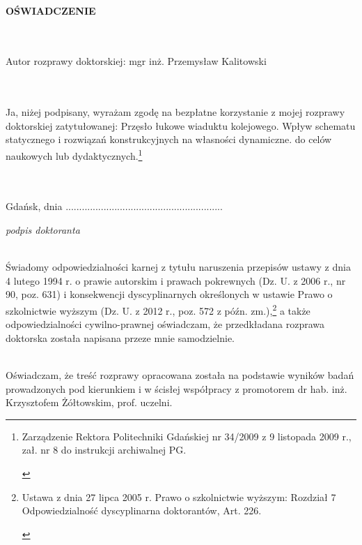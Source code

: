 \begin{figure}
	 \hfill
	
\end{figure}


\begin{myfont}
	\thispagestyle{plain}
	\noindent
	\\ 
	\textbf{OŚWIADCZENIE}
	
	\footnotesize
	\noindent
	\\ \\
	Autor rozprawy doktorskiej: mgr inż. Przemysław Kalitowski
	
	\noindent
	\\ \\
	Ja, niżej podpisany, wyrażam zgodę na bezpłatne korzystanie z mojej rozprawy doktorskiej zatytułowanej: 
	Przęsło łukowe wiaduktu kolejowego. Wpływ schematu statycznego i rozwiązań konstrukcyjnych na własności dynamiczne.
	\noindent
	do celów naukowych lub dydaktycznych.\footnote{\begin{myfont}\scriptsize 
			Zarządzenie Rektora Politechniki Gdańskiej nr 34/2009 z 9 listopada 2009 r., zał. nr 8 do instrukcji archiwalnej PG.\end{myfont}}
	
	\noindent
	\\ \\
	Gdańsk, dnia .............................\hfill.............................
	
	\scriptsize \noindent
	\null\hfill \textit{podpis doktoranta}
	
	
	\footnotesize \noindent
	\\
	Świadomy odpowiedzialności karnej z tytułu naruszenia przepisów ustawy z dnia 4 lutego 1994 r. o prawie autorskim i prawach pokrewnych (Dz. U. z 2006 r., nr 90, poz. 631) i konsekwencji dyscyplinarnych określonych w ustawie Prawo o szkolnictwie wyższym (Dz. U. z 2012 r., poz. 572 z późn. zm.),\footnote{\begin{myfont}\scriptsize Ustawa z dnia 27 lipca 2005 r. Prawo o szkolnictwie wyższym: Rozdział 7 Odpowiedzialność dyscyplinarna doktorantów, Art. 226.
	\end{myfont}}
	a także odpowiedzialności cywilno-prawnej oświadczam, że przedkładana rozprawa doktorska została napisana przeze mnie samodzielnie.
	
	\footnotesize \noindent
	\\
	Oświadczam, że treść rozprawy opracowana została na podstawie wyników badań prowadzonych pod kierunkiem i w ścisłej współpracy z promotorem dr hab. inż. Krzysztofem Żółtowskim, prof. uczelni.
	

\end{myfont}
